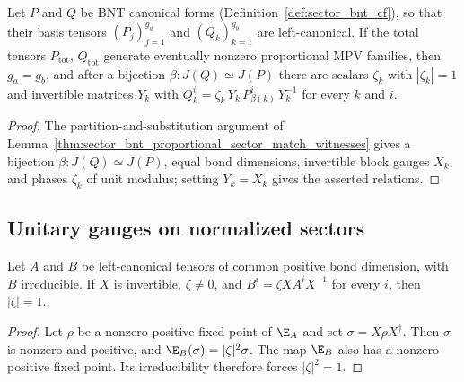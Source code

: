 \begin{theorem}%
    \label{thm:cpgsv_multiblock_ft_left_canonical}
    \leanok
    Let $P$ and $Q$ be BNT canonical forms (Definition~\ref{def:sector_bnt_cf}),
    so that their basis tensors $(P_j)_{j=1}^{g_a}$ and $(Q_k)_{k=1}^{g_b}$ are
    left-canonical. If the total tensors $P_{\mathrm{tot}}$,
    $Q_{\mathrm{tot}}$ generate eventually nonzero proportional MPV families,
    then $g_a=g_b$, and after a bijection $\beta:J(Q)\simeq J(P)$ there are
    scalars $\zeta_k$ with $|\zeta_k|=1$ and invertible matrices $Y_k$ with
    $Q_k^i=\zeta_k\,Y_k\,P_{\beta(k)}^i\,Y_k^{-1}$ for every $k$ and $i$.
\end{theorem}

\begin{proof}\leanok
    The partition-and-substitution argument of
    Lemma~\ref{thm:sector_bnt_proportional_sector_match_witnesses} gives a
    bijection $\beta:J(Q)\simeq J(P)$, equal bond dimensions, invertible block
    gauges $X_k$, and phases $\zeta_k$ of unit modulus; setting $Y_k=X_k$ gives
    the asserted relations.
\end{proof}

\subsection{Unitary gauges on normalized sectors}
\label{subsec:ft_unitary_sector_gauges}

\begin{lemma}
    \label{lem:left_canonical_irreducible_phase_norm}
    \leanok
    Let $A$ and $B$ be left-canonical tensors of common positive bond
    dimension, with $B$ irreducible. If $X$ is invertible, $\zeta\ne0$, and
    $B^i=\zeta XA^iX^{-1}$ for every $i$, then $|\zeta|=1$.
\end{lemma}

\begin{proof}\leanok

    Let $\rho$ be a nonzero positive fixed point of $\E_A$ and set
    $\sigma=X\rho X^\dagger$. Then $\sigma$ is nonzero and positive, and
    $\E_B(\sigma)=|\zeta|^2\sigma$. The map $\E_B$ also has a nonzero positive
    fixed point. Its irreducibility therefore forces $|\zeta|^2=1$.
\end{proof}

